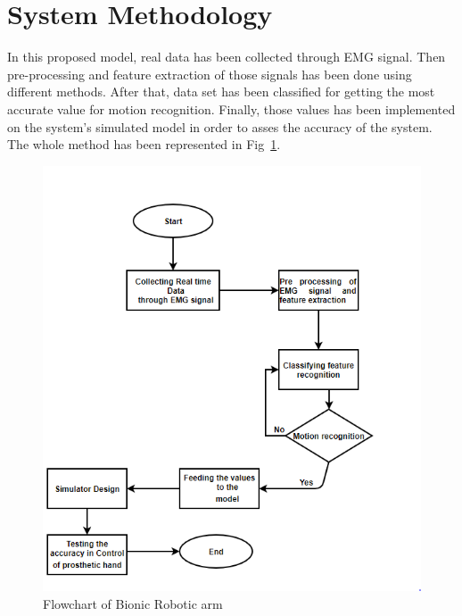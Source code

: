 \documentclass[conference]{IEEEtran}
\begin{document}
\section{System Methodology}
In this proposed model, real data has been collected through EMG signal. Then pre-processing and feature extraction of those signals has been  done using different methods. After that, data set has been classified for getting the most accurate value for motion recognition. Finally, those values has been implemented on the system's simulated model in order to asses the accuracy of the system. The whole method has been represented in Fig~\ref{fig:1}.
\begin{figure}[htbp]
\centerline{\includegraphics[scale=0.6]{Capturex.PNG}}
\caption{Flowchart of Bionic Robotic arm}
\label{fig:1}
\end{figure}
\end{document}
